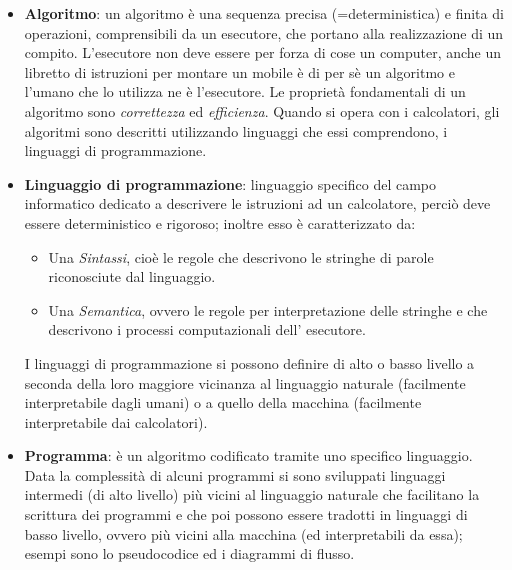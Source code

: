 \begin{itemize}
	\item\textbf{Algoritmo}: un algoritmo è una sequenza precisa (=deterministica) e finita di operazioni, comprensibili da un esecutore, che portano alla realizzazione di un compito. L'esecutore non deve essere per forza di cose un computer, anche un libretto di istruzioni per montare un mobile è di per sè un algoritmo e l'umano che lo utilizza ne è l'esecutore.
	Le proprietà fondamentali di un algoritmo sono \textit{correttezza} ed \textit{efficienza}. Quando si opera con i calcolatori, gli algoritmi sono descritti utilizzando linguaggi che essi comprendono, i linguaggi di programmazione. 

	\item\textbf{Linguaggio di programmazione}: linguaggio specifico del campo informatico dedicato a descrivere le istruzioni ad un calcolatore, perciò deve essere deterministico e rigoroso; inoltre esso è caratterizzato da: 
	\begin{itemize}
	    \item Una \textit{Sintassi}, cioè le regole che descrivono le stringhe di parole riconosciute dal linguaggio.
	    \item Una \textit{Semantica}, ovvero le regole per interpretazione delle stringhe e che descrivono i processi computazionali dell’ esecutore.
	\end{itemize}
    I linguaggi di programmazione si possono definire di alto o basso livello a seconda della loro maggiore vicinanza al linguaggio naturale (facilmente interpretabile dagli umani) o a quello della macchina (facilmente interpretabile dai calcolatori).

	\item\textbf{Programma}: è un algoritmo codificato tramite uno specifico linguaggio. 
	Data la complessità di alcuni programmi si sono sviluppati linguaggi intermedi (di alto livello) più vicini al linguaggio naturale che facilitano la scrittura dei programmi e che poi possono essere tradotti in linguaggi di basso livello, ovvero più vicini alla macchina (ed interpretabili da essa); esempi sono lo pseudocodice ed i diagrammi di flusso.
\end{itemize}

